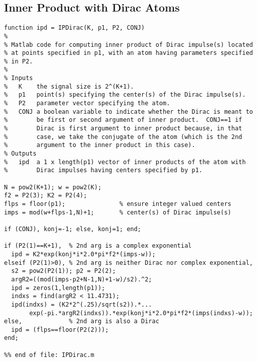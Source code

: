 \subsection{Inner Product with Dirac Atoms}
\begin{small}\begin{verbatim}
function ipd = IPDirac(K, p1, P2, CONJ)
%
% Matlab code for computing inner product of Dirac impulse(s) located
% at points specified in p1, with an atom having parameters specified
% in P2.
%
% Inputs
%   K    the signal size is 2^(K+1).
%   p1   point(s) specifying the center(s) of the Dirac impulse(s).
%   P2   parameter vector specifying the atom.
%   CONJ a boolean variable to indicate whether the Dirac is meant to
%        be first or second argument of inner product.  CONJ==1 if
%        Dirac is first argument to inner product because, in that
%        case, we take the conjugate of the atom (which is the 2nd
%        argument to the inner product in this case).
% Outputs
%   ipd  a 1 x length(p1) vector of inner products of the atom with
%        Dirac impulses having centers specified by p1.

N = pow2(K+1); w = pow2(K);
f2 = P2(3); K2 = P2(4);
flps = floor(p1);               % ensure integer valued centers
imps = mod(w+flps-1,N)+1;       % center(s) of Dirac impulse(s)

if (CONJ), konj=-1; else, konj=1; end; 

if (P2(1)==K+1),  % 2nd arg is a complex exponential
  ipd = K2*exp(konj*i*2.0*pi*f2*(imps-w));
elseif (P2(1)>0), % 2nd arg is neither Dirac nor complex exponential,
  s2 = pow2(P2(1)); p2 = P2(2); 
  argR2=((mod(imps-p2+N-1,N)+1-w)/s2).^2; 
  ipd = zeros(1,length(p1));
  indxs = find(argR2 < 11.4731); 
  ipd(indxs) = (K2*2^(.25)/sqrt(s2)).*...
       exp(-pi.*argR2(indxs)).*exp(konj*i*2.0*pi*f2*(imps(indxs)-w));
else,             % 2nd arg is also a Dirac
  ipd = (flps==floor(P2(2)));
end;

%% end of file: IPDirac.m
\end{verbatim}   \end{small}


